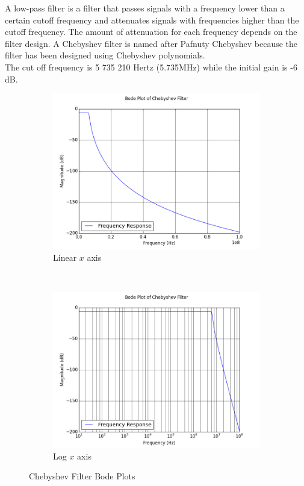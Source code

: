 \documentclass[11pt,a4paper]{article}
\begin{document}
A low-pass filter is a filter that passes signals with a frequency lower than a certain cutoff frequency and attenuates signals with frequencies higher than the cutoff frequency. The amount of attenuation for each frequency depends on the filter design. A Chebyshev filter is named after Pafnuty Chebyshev because the filter has been designed using Chebyshev polynomials.\\
The cut off frequency is  5 735 210 Hertz (5.735MHz) while the initial gain is -6 dB.

\medskip
\begin{figure}[h] %
	\centering
	\begin{subfigure}{0.4\textwidth}
		\centering
		\includegraphics[width=\textwidth]{Images/Bode_Linear.png}
		\caption{Linear $x$ axis}
		\label{fig:Bode_Linear}
	\end{subfigure}%
	~
	\begin{subfigure}{0.4\textwidth}
		\centering
		\includegraphics[width=\textwidth]{Images/Bode_SemiLogX.png}
		\caption{Log $x$ axis}
		\label{fig:Bode_SemiLogX}
	\end{subfigure}
	\caption{Chebyshev Filter Bode Plots}
	\label{fig:Bode_Plots}
\end{figure}
\end{document}
